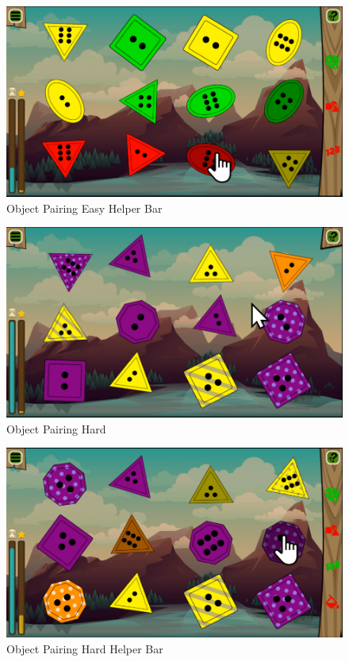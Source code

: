 \begin{figure}[H]
    \centering
    \includegraphics[width=1\textwidth]{figures/gameeasyhelp}
    \caption{Object Pairing Easy Helper Bar}
    \label{fig:gameeasyhelp}
\end{figure}

\begin{figure}[H]
    \centering
    \includegraphics[width=1\textwidth]{figures/gamehard}
    \caption{Object Pairing Hard}
    \label{fig:gamehard}
\end{figure}

\begin{figure}[H]
    \centering
    \includegraphics[width=1\textwidth]{figures/gamehardhelp}
    \caption{Object Pairing Hard Helper Bar}
    \label{fig:gamehardhelp}
\end{figure}

